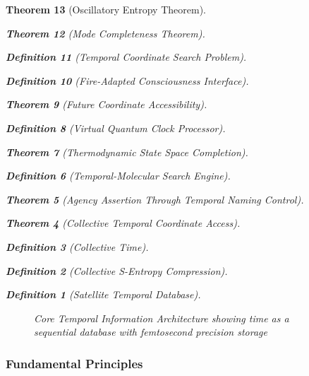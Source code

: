 \documentclass[12pt,a4paper]{article}
\newtheorem{theorem}{Theorem}[section]
\newtheorem{definition}[theorem]{Definition}
\begin{document}
\begin{theorem}[Oscillatory Entropy Theorem]
\begin{theorem}[Mode Completeness Theorem]
\begin{enumerate}
\begin{definition}[Temporal Coordinate Search Problem]
\begin{algorithm}
\begin{definition}[Fire-Adapted Consciousness Interface]
\begin{theorem}[Future Coordinate Accessibility]
\begin{definition}[Virtual Quantum Clock Processor]
\begin{itemize}
\begin{itemize}
\begin{theorem}[Thermodynamic State Space Completion]
\begin{definition}[Temporal-Molecular Search Engine]
\begin{theorem}[Agency Assertion Through Temporal Naming Control]
\begin{remark}
\begin{theorem}[Collective Temporal Coordinate Access]
\begin{definition}[Collective Time]
\begin{definition}[Collective S-Entropy Compression]
\begin{definition}[Satellite Temporal Database]
\begin{algorithm}
\begin{table}[h]
{{\begin{figure}[H]
\caption{Core Temporal Information Architecture showing time as a sequential database with femtosecond precision storage}
\label{fig:temporal_information_architecture}
\end{figure}

\subsubsection{Fundamental Principles}

}}
\end{table}
\end{algorithm}
\end{definition}
\end{definition}
\end{definition}
\end{theorem}
\end{remark}
\end{theorem}
\end{definition}
\end{theorem}
\end{itemize}
\end{itemize}
\end{definition}
\end{theorem}
\end{definition}
\end{algorithm}
\end{definition}
\end{enumerate}
\end{theorem}
\end{theorem}
\end{document}
